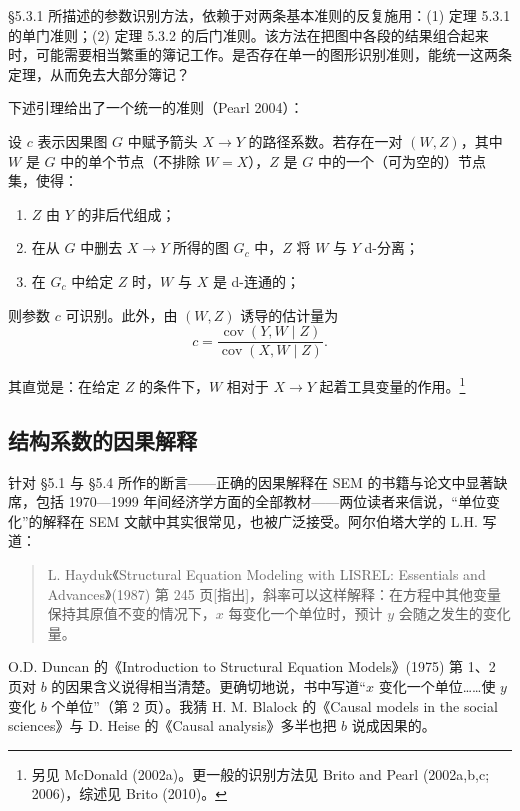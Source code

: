 
\S5.3.1 所描述的参数识别方法，依赖于对两条基本准则的反复施用：(1) 定理 5.3.1 的单门准则；(2) 定理 5.3.2 的后门准则。该方法在把图中各段的结果组合起来时，可能需要相当繁重的簿记工作。是否存在单一的图形识别准则，能统一这两条定理，从而免去大部分簿记？


下述引理给出了一个统一的准则（Pearl 2004）：

\begin{lemma}[直接效应的图形识别]\label{lem:11.5.1}
设 $c$ 表示因果图 $G$ 中赋予箭头 $X\to Y$ 的路径系数。若存在一对 $(W,Z)$，其中 $W$ 是 $G$ 中的单个节点（不排除 $W=X$），$Z$ 是 $G$ 中的一个（可为空的）节点集，使得：
\begin{enumerate}[label=\arabic*.,leftmargin=1.8em]
\item $Z$ 由 $Y$ 的非后代组成；
\item 在从 $G$ 中删去 $X\to Y$ 所得的图 $G_c$ 中，$Z$ 将 $W$ 与 $Y$ d-分离；
\item 在 $G_c$ 中给定 $Z$ 时，$W$ 与 $X$ 是 d-连通的；
\end{enumerate}
则参数 $c$ 可识别。此外，由 $(W,Z)$ 诱导的估计量为
\[
c=\frac{\operatorname{cov}(Y,W\mid Z)}{\operatorname{cov}(X,W\mid Z)}.
\]
\end{lemma}

其直觉是：在给定 $Z$ 的条件下，$W$ 相对于 $X\to Y$ 起着工具变量的作用。\footnote{另见 McDonald (2002a)。更一般的识别方法见 Brito and Pearl (2002a,b,c; 2006)，综述见 Brito (2010)。}

\subsection{结构系数的因果解释}


针对 \S5.1 与 \S5.4 所作的断言——正确的因果解释在 SEM 的书籍与论文中显著缺席，包括 1970—1999 年间经济学方面的全部教材——两位读者来信说，“单位变化”的解释在 SEM 文献中其实很常见，也被广泛接受。阿尔伯塔大学的 L.H. 写道：

\begin{quote}\kaishu
L. Hayduk《Structural Equation Modeling with LISREL: Essentials and Advances》(1987) 第 245 页[指出]，斜率可以这样解释：在方程中其他变量保持其原值不变的情况下，$x$ 每变化一个单位时，预计 $y$ 会随之发生的变化量。
\end{quote}

O.D. Duncan 的《Introduction to Structural Equation Models》(1975) 第 1、2 页对 $b$ 的因果含义说得相当清楚。更确切地说，书中写道“$x$ 变化一个单位……使 $y$ 变化 $b$ 个单位”（第 2 页）。我猜 H. M. Blalock 的《Causal models in the social sciences》与 D. Heise 的《Causal analysis》多半也把 $b$ 说成因果的。

